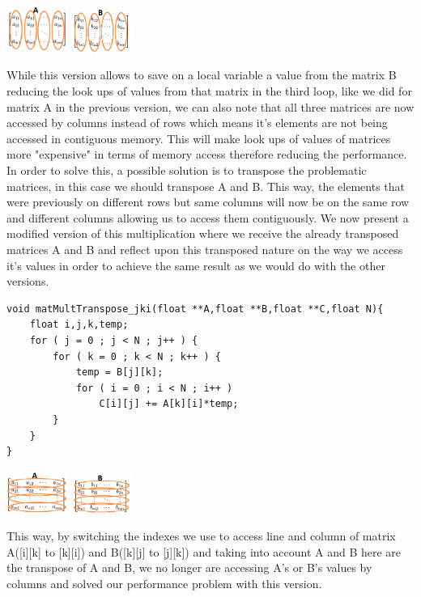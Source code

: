 \documentclass[journal]{IEEEtran}
\begin{document}
\includegraphics[width=0.15\textwidth, left]{A_column.png}
\includegraphics[width=0.15\textwidth, right]{B_column.png}

While this version allows to save on a local variable a value from the matrix B reducing the look ups of values from that matrix in the third loop, like we did for matrix A in the previous version, we can also note that all three matrices are now accessed by columns instead of rows which means it's elements are not being accessed in contiguous memory.  This will make look ups of values of matrices more "expensive" in terms of memory access therefore reducing the performance. In order to solve this, a possible solution is to transpose the problematic matrices, in this case we should transpose A and B. This way, the elements that were previously on different rows but same columns will now be on the same row and different columns allowing us to access them contiguously. We now present a modified version of this multiplication where we receive the already transposed matrices A and B and reflect upon this transposed nature on the way we access it's values in order to achieve the same result as we would do with the other versions.
\begin{lstlisting}
void matMultTranspose_jki(float **A,float **B,float **C,float N){
    float i,j,k,temp;
    for ( j = 0 ; j < N ; j++ ) {
        for ( k = 0 ; k < N ; k++ ) {
            temp = B[j][k];
            for ( i = 0 ; i < N ; i++ )
                C[i][j] += A[k][i]*temp;
        }
    }
}
\end{lstlisting}

\includegraphics[width=0.15\textwidth, left]{A_row.png}
\includegraphics[width=0.15\textwidth, right]{B_row.png}

This way, by switching the indexes we use to access line and column of matrix A([i][k] to [k][i]) and B([k][j] to [j][k]) and taking into account A and B here are the transpose of A and B, we no longer are accessing A's or B's values by columns and solved our performance problem with this version.\\
\end{document}
